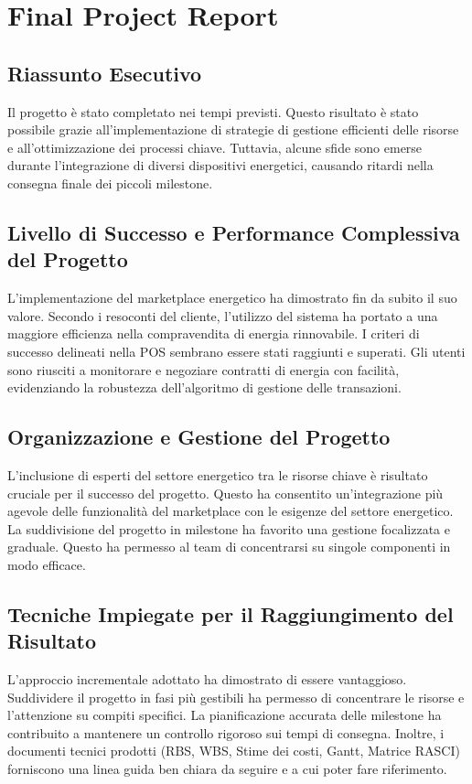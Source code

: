 \documentclass{report}
\begin{document}
\chapter*{Final Project Report}

\section*{Riassunto Esecutivo}
Il progetto è stato completato nei tempi previsti. Questo risultato è stato possibile grazie all'implementazione di strategie di gestione efficienti delle risorse e all'ottimizzazione dei processi chiave.
Tuttavia, alcune sfide sono emerse durante l'integrazione di diversi dispositivi energetici, causando ritardi nella consegna finale dei piccoli milestone.

\section*{Livello di Successo e Performance Complessiva del Progetto}
L'implementazione del marketplace energetico ha dimostrato fin da subito il suo valore. Secondo i resoconti del cliente, l'utilizzo del sistema ha portato a una maggiore efficienza nella compravendita di energia rinnovabile. I criteri di successo delineati nella POS sembrano essere stati raggiunti e superati.
Gli utenti sono riusciti a monitorare e negoziare contratti di energia con facilità, evidenziando la robustezza dell'algoritmo di gestione delle transazioni.

\section*{Organizzazione e Gestione del Progetto}
L'inclusione di esperti del settore energetico tra le risorse chiave è risultato cruciale per il successo del progetto. Questo ha consentito un'integrazione più agevole delle funzionalità del marketplace con le esigenze del settore energetico.
La suddivisione del progetto in milestone ha favorito una gestione focalizzata e graduale. Questo ha permesso al team di concentrarsi su singole componenti in modo efficace.

\section*{Tecniche Impiegate per il Raggiungimento del Risultato}
L'approccio incrementale adottato ha dimostrato di essere vantaggioso. Suddividere il progetto in fasi più gestibili ha permesso di concentrare le risorse e l'attenzione su compiti specifici. La pianificazione accurata delle milestone ha contribuito a mantenere un controllo rigoroso sui tempi di consegna.
Inoltre, i documenti tecnici prodotti (RBS, WBS, Stime dei costi, Gantt, Matrice RASCI) forniscono una linea guida ben chiara da seguire e a cui poter fare riferimento.
\end{document}
